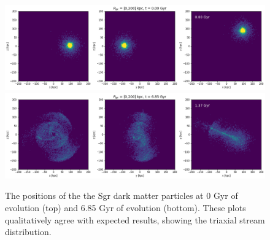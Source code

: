 \begin{figure}[t]
    \centering
    \includegraphics[width=0.9\linewidth]{fig/cdm/merged_dm_0.png}
    \includegraphics[width=0.9\linewidth]{fig/cdm/merged_dm_685.png}
    \caption{
        The positions of the the Sgr dark matter particles at 0 Gyr of evolution
        (top) and 6.85 Gyr of evolution (bottom). These plots qualitatively
        agree with expected results, showing the triaxial stream distribution.
    }
    \label{fig:cdm_merged_dm}
\end{figure}
